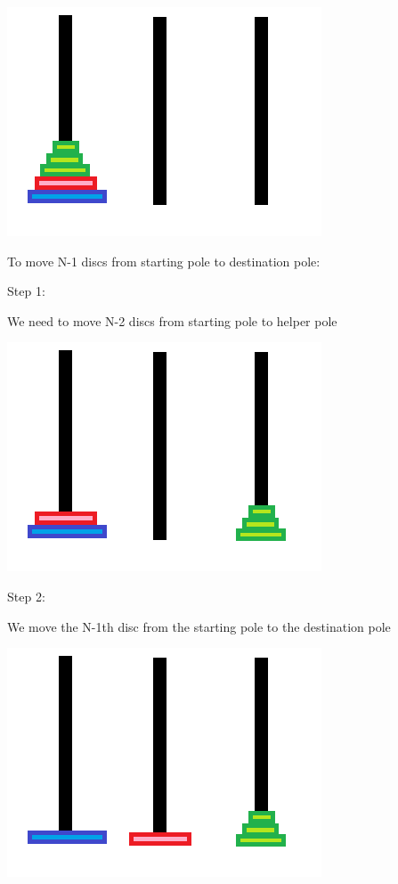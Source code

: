 \documentclass[11pt,oneside]{book}
\makeatletter
\def\maxwidth#1{\ifdim\Gin@nat@width>#1 #1\else\Gin@nat@width\fi}
\makeatother
\begin{document}
\vspace{5px}\includegraphics[width=\maxwidth{\textwidth}]{hanoi.png}

To move N-1 discs from starting pole to destination pole:

Step 1:

We need to move N-2 discs from starting pole to helper pole

\vspace{5px}\includegraphics[width=\maxwidth{\textwidth}]{hanoi5.png}

Step 2:

We move the N-1th disc from the starting pole to the destination pole

\vspace{5px}\includegraphics[width=\maxwidth{\textwidth}]{hanoi6.png}
\end{document}
